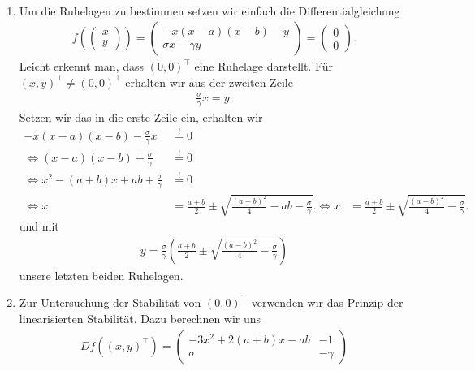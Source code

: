 \begin{solution}
\leavevmode \\
\begin{enumerate}[label = \textbf{\alph*)}]
\item Um die Ruhelagen zu bestimmen setzen wir einfach die Differentialgleichung
\begin{align*}
  f\left(\begin{pmatrix}
    x \\ y
  \end{pmatrix}\right) =
  \begin{pmatrix}
    -x(x - a)(x - b) - y \\
    \sigma x - \gamma y
  \end{pmatrix}
  = \begin{pmatrix}
    0 \\ 0
  \end{pmatrix}.
\end{align*}
Leicht erkennt man, dass $(0,0)^{\top}$ eine Ruhelage darstellt.
Für $(x,y)^{\top} \neq (0,0)^{\top}$ erhalten wir aus der zweiten Zeile
\begin{align*}
   \frac{\sigma}{\gamma}x =  y.
\end{align*}
Setzen wir das in die erste Zeile ein, erhalten wir
\begin{align*}
  -x(x - a)(x - b) - \frac{\sigma}{\gamma}x &\stackrel{!}{=} 0 \\
  \iff (x - a)(x - b) + \frac{\sigma}{\gamma} &\stackrel{!}{=} 0 \\
  \iff x^2 -(a+b)x + ab + \frac{\sigma}{\gamma} &\stackrel{!}{=} 0 \\
  \iff x &= \frac{a+b}{2} \pm \sqrt{\frac{(a+b)^2}{4} - ab - \frac{\sigma}{\gamma}}.
  \iff x &= \frac{a+b}{2} \pm \sqrt{\frac{(a-b)^2}{4}  - \frac{\sigma}{\gamma}}.
\end{align*}
und mit
\begin{align*}
  y = \frac{\sigma}{\gamma}\left(\frac{a+b}{2} \pm \sqrt{\frac{(a-b)^2}{4} - \frac{\sigma}{\gamma}}\right)
\end{align*}
unsere letzten beiden Ruhelagen.
\item Zur Untersuchung der Stabilität von $(0,0)^{\top}$ verwenden wir das Prinzip
der linearisierten Stabilität. Dazu berechnen wir uns
\begin{align*}
Df((x,y)^{\top}) = \begin{pmatrix}
  -3x^2 + 2(a+b)x - ab & -1 \\
  \sigma & - \gamma
\end{pmatrix}

\end{align*}
\end{enumerate}
\end{solution}
